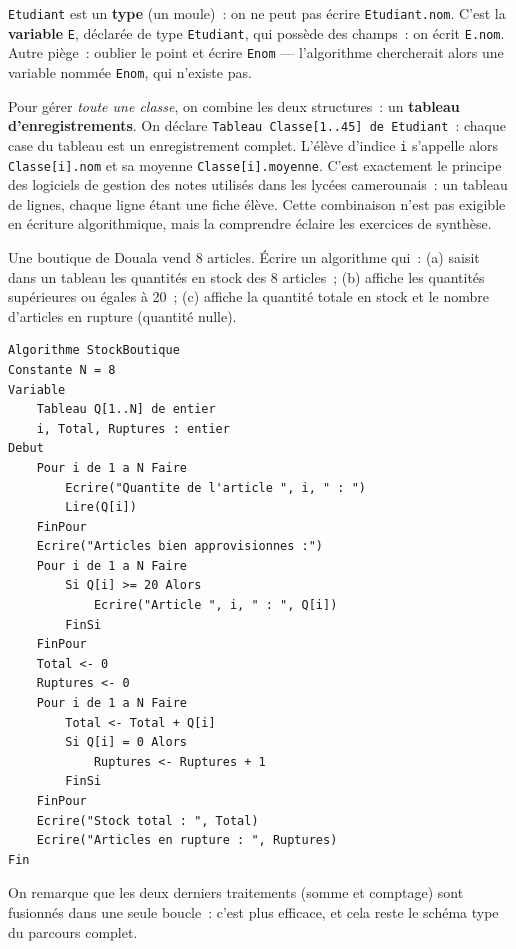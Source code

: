 \documentclass[11pt]{article}
\begin{document}
\begin{attention}
\texttt{Etudiant} est un \textbf{type} (un moule)~: on ne peut pas \'ecrire \texttt{Etudiant.nom}. C'est la \textbf{variable} \texttt{E}, d\'eclar\'ee de type \texttt{Etudiant}, qui poss\`ede des champs~: on \'ecrit \texttt{E.nom}. Autre pi\`ege~: oublier le point et \'ecrire \texttt{Enom} --- l'algorithme chercherait alors une variable nomm\'ee \texttt{Enom}, qui n'existe pas.
\end{attention}

\begin{savaistu}
Pour g\'erer \emph{toute une classe}, on combine les deux structures~: un \textbf{tableau d'enregistrements}. On d\'eclare \texttt{Tableau Classe[1..45] de Etudiant}~: chaque case du tableau est un enregistrement complet. L'\'el\`eve d'indice \texttt{i} s'appelle alors \texttt{Classe[i].nom} et sa moyenne \texttt{Classe[i].moyenne}. C'est exactement le principe des logiciels de gestion des notes utilis\'es dans les lyc\'ees camerounais~: un tableau de lignes, chaque ligne \'etant une fiche \'el\`eve. Cette combinaison n'est pas exigible en \'ecriture algorithmique, mais la comprendre \'eclaire les exercices de synth\`ese.
\end{savaistu}

\begin{exercice}
Une boutique de Douala vend 8 articles. \'Ecrire un algorithme qui~: (a) saisit dans un tableau les quantit\'es en stock des 8 articles~; (b) affiche les quantit\'es sup\'erieures ou \'egales \`a 20~; (c) affiche la quantit\'e totale en stock et le nombre d'articles en rupture (quantit\'e nulle).
\end{exercice}

\begin{corrige}
\begin{lstlisting}
Algorithme StockBoutique
Constante N = 8
Variable
    Tableau Q[1..N] de entier
    i, Total, Ruptures : entier
Debut
    Pour i de 1 a N Faire
        Ecrire("Quantite de l'article ", i, " : ")
        Lire(Q[i])
    FinPour
    Ecrire("Articles bien approvisionnes :")
    Pour i de 1 a N Faire
        Si Q[i] >= 20 Alors
            Ecrire("Article ", i, " : ", Q[i])
        FinSi
    FinPour
    Total <- 0
    Ruptures <- 0
    Pour i de 1 a N Faire
        Total <- Total + Q[i]
        Si Q[i] = 0 Alors
            Ruptures <- Ruptures + 1
        FinSi
    FinPour
    Ecrire("Stock total : ", Total)
    Ecrire("Articles en rupture : ", Ruptures)
Fin
\end{lstlisting}
On remarque que les deux derniers traitements (somme et comptage) sont fusionn\'es dans une seule boucle~: c'est plus efficace, et cela reste le sch\'ema type du parcours complet.
\end{corrige}
\end{document}
